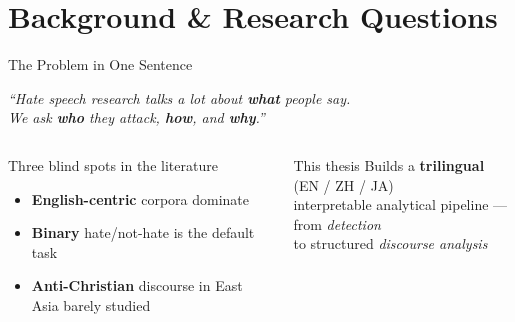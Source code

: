 \documentclass[aspectratio=169,10pt]{beamer}
\newcommand{\highlight}[1]{{\color{accent}\textbf{#1}}}
\begin{document}
\section{Background \& Research Questions}

\begin{frame}{The Problem in One Sentence}
  \begin{center}
    \large
    \textit{``Hate speech research talks a lot about \highlight{what} people say.\\[6pt]
    We ask \highlight{who} they attack, \highlight{how}, and \highlight{why}.''}
  \end{center}
  \vspace{6pt}
  \begin{columns}[T]
      \begin{block}{Three blind spots in the literature}
        \begin{itemize}
          \item \textbf{English-centric} corpora dominate
          \item \textbf{Binary} hate/not-hate is the default task
          \item \textbf{Anti-Christian} discourse in East Asia barely studied
        \end{itemize}
      \end{block}
      \begin{alertblock}{This thesis}
        Builds a \textbf{trilingual} (EN / ZH / JA)\\
        interpretable analytical pipeline ---\\[4pt]
        \quad from \emph{detection}\\
        \quad to structured \emph{discourse analysis}
      \end{alertblock}
  \end{columns}
\end{frame}
\end{document}
